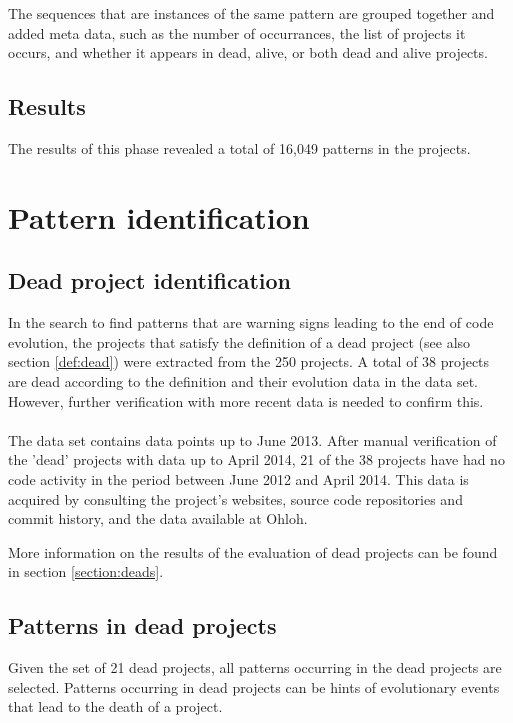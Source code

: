 The sequences that are instances of the same pattern are grouped together and
added meta data, such as the number of occurrances, the list of projects
it occurs, and whether it appears in dead, alive, or both dead and alive
projects.

\subsection{Results}
The results of this phase revealed a total of 16,049 patterns in the projects.

\section{Pattern identification}
\subsection{Dead project identification}
In the search to find patterns that are warning signs leading to the end of
code evolution, the projects that satisfy the definition of a dead project (see
also section \ref{def:dead}) were extracted from the 250 projects.
A total of 38 projects are dead according to the definition and their evolution
data in the data set. However, further verification with more recent data is
needed to confirm this.

\paragraph{}
The data set contains data points up to June 2013. After manual verification of
the 'dead' projects with data up to April 2014, 21 of the 38 projects have had
no code activity in the period between June 2012 and April 2014. This data is
acquired by consulting the project's websites, source code repositories and
commit history, and the data available at Ohloh.

More information on the results of the evaluation of dead projects can be found
in section \ref{section:deads}.

\subsection{Patterns in dead projects}
\label{section:patterns_dead}
Given the set of 21 dead projects, all patterns occurring in the dead
projects are selected. Patterns occurring in dead projects can be hints of
evolutionary events that lead to the death of a project.

